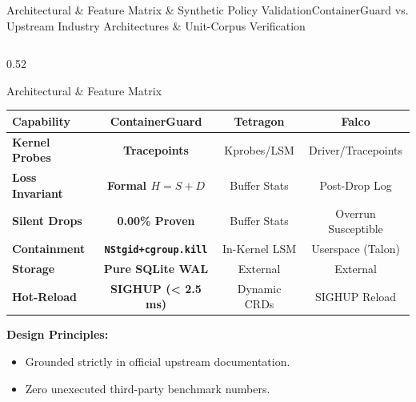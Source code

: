 \documentclass[aspectratio=169,10pt]{beamer}
\begin{document}
\begin{frame}{Architectural \& Feature Matrix \& Synthetic Policy Validation}{ContainerGuard vs. Upstream Industry Architectures \& Unit-Corpus Verification}
  \begin{columns}[T]
    \begin{column}{0.52\textwidth}
      \begin{block}{Architectural \& Feature Matrix}
        \tiny
        \begin{tabularx}{\textwidth}{l c c c}
          \toprule
          \textbf{Capability} & \textbf{ContainerGuard} & \textbf{Tetragon} & \textbf{Falco} \\
          \midrule
          \textbf{Kernel Probes} & \textbf{Tracepoints} & Kprobes/LSM & Driver/Tracepoints \\
          \textbf{Loss Invariant} & \textbf{Formal $H=S+D$} & Buffer Stats & Post-Drop Log \\
          \textbf{Silent Drops} & \textbf{0.00\% Proven} & Buffer Stats & Overrun Susceptible \\
          \textbf{Containment} & \textbf{\texttt{NStgid+cgroup.kill}} & In-Kernel LSM & Userspace (Talon) \\
          \textbf{Storage} & \textbf{Pure SQLite WAL} & External & External \\
          \textbf{Hot-Reload} & \textbf{SIGHUP (< 2.5 ms)} & Dynamic CRDs & SIGHUP Reload \\
          \bottomrule
        \end{tabularx}
        \vspace{0.1cm}
        \scriptsize
        \textbf{Design Principles:}
        \begin{itemize}
          \item Grounded strictly in official upstream documentation.
          \item Zero unexecuted third-party benchmark numbers.
        \end{itemize}
      \end{block}
    \end{column}


\end{columns}
\end{frame}
\end{document}
